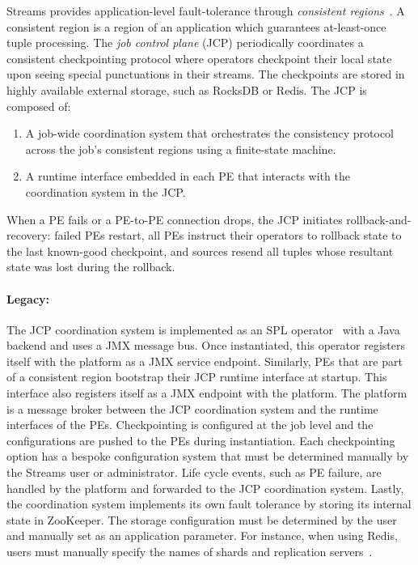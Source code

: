 Streams provides application-level fault-tolerance through \emph{consistent
regions}~\cite{consistent_regions}. A consistent region is a region of an
application which guarantees at-least-once tuple processing.  The \emph{job
control plane} (JCP) periodically coordinates a consistent checkpointing protocol
where operators checkpoint their local state upon seeing special punctuations in their
streams. The checkpoints are stored in highly available external storage, such
as RocksDB or Redis. The JCP is composed of:

\begin{enumerate}
    \item A job-wide coordination system that orchestrates the consistency
        protocol across the job's consistent regions using a finite-state machine.
    \item A runtime interface embedded in each PE that interacts with the 
        coordination system in the JCP.
\end{enumerate}

When a PE fails or a PE-to-PE connection drops, the JCP initiates
rollback-and-recovery: failed PEs restart, all PEs instruct their operators to
rollback state to the last known-good checkpoint, and sources resend all tuples
whose resultant state was lost during the rollback.

\paragraph{Legacy:} The JCP coordination system is implemented as an SPL
operator~\cite{JCPOperator} with a Java backend and uses a JMX message bus.
Once instantiated, this operator registers itself with the platform as a JMX
service endpoint. Similarly, PEs that are part of a consistent region bootstrap
their JCP runtime interface at startup.  This interface also registers itself as
a JMX endpoint with the platform.  The platform is a message broker between the
JCP coordination system and the runtime interfaces of the PEs.  Checkpointing is
configured at the job level and the configurations are pushed to the PEs during
instantiation. Each checkpointing option has a bespoke configuration system that
must be determined manually by the Streams user or administrator. Life cycle
events, such as PE failure, are handled by the platform and forwarded to the JCP
coordination system.  Lastly, the coordination system implements its own fault
tolerance by storing its internal state in ZooKeeper. The storage configuration
must be determined by the user and manually set as an application parameter. For
instance, when using Redis, users must manually specify the names of shards and
replication servers~\cite{streamsredis}.

